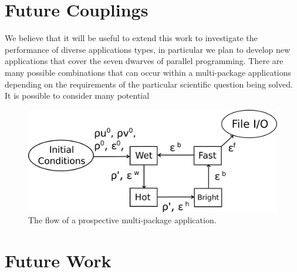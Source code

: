 \documentclass[runningheads,a4paper]{llncs}
\begin{document}

\section{Future Couplings}

We believe that it will be useful to extend this work to investigate the performance of diverse applications types, in particular we plan to develop new applications that cover the seven dwarves of parallel programming. There are many possible combinations that can occur within a multi-package applications depending on the requirements of the particular scientific question being solved. It is possible to consider many potential 

\begin{figure}
\centering
\includegraphics[width=0.8\linewidth]{all-four-flow}
\caption{The flow of a prospective multi-package application.}
\label{fig:multi-package-flow}
\end{figure}

\section{Future Work}
\end{document}
